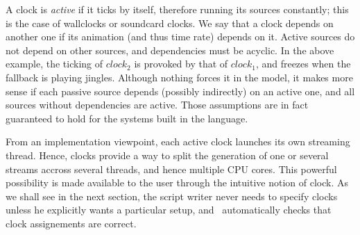 A clock is \emph{active} if it ticks by itself,
therefore running its sources constantly; this
is the case of wallclocks or soundcard clocks.
We say that a clock depends on another one
if its animation (and thus time rate) depends on it.
Active sources do not depend on other sources,
and dependencies must be acyclic.
In the above example, the ticking of
$clock_2$ is provoked by that of
$clock_1$, and freezes when the fallback
is playing jingles.
Although nothing forces it in the model, it makes more sense if
each passive source depends (possibly indirectly) on an active one,
and all sources without dependencies are active.
Those assumptions are in fact guaranteed to hold for the systems
built in the \liquidsoap{} language.

From an implementation viewpoint, each active clock launches
its own streaming thread.
Hence, clocks provide a way to split the generation of one or
several streams accross several threads,
and hence multiple CPU cores.
This powerful possibility is made available to the user
through the intuitive notion of clock.
As we shall see in the next section,
the script writer never needs to specify clocks unless he
explicitly wants a particular setup,
and \liquidsoap\ automatically checks that clock assignements
are correct.

